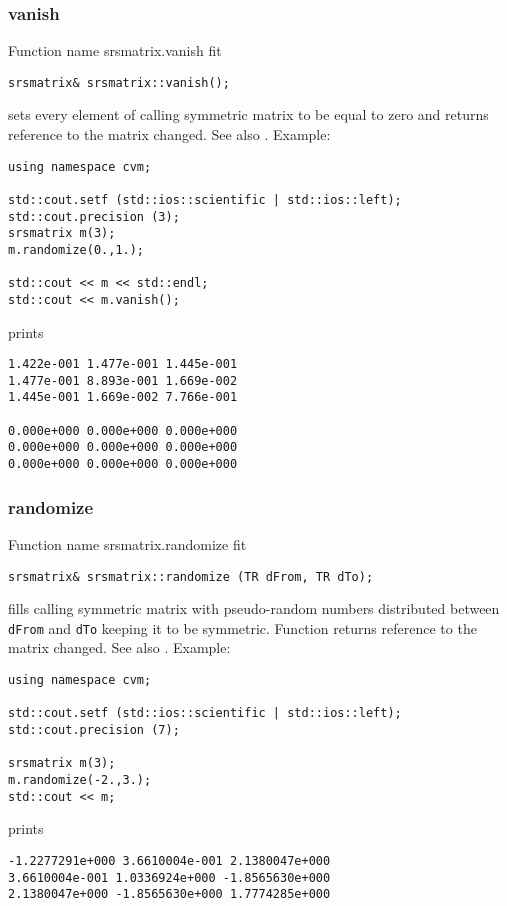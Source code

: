 \subsubsection{vanish}
Function%
\pdfdest name {srsmatrix.vanish} fit
\begin{verbatim}
srsmatrix& srsmatrix::vanish();
\end{verbatim}
sets every element of  calling symmetric 
matrix to be equal to zero
and returns  reference to
the matrix changed.
See also .
Example:
\begin{Verbatim}
using namespace cvm;

std::cout.setf (std::ios::scientific | std::ios::left); 
std::cout.precision (3);
srsmatrix m(3);
m.randomize(0.,1.);

std::cout << m << std::endl;
std::cout << m.vanish();
\end{Verbatim}
prints
\begin{Verbatim}
1.422e-001 1.477e-001 1.445e-001
1.477e-001 8.893e-001 1.669e-002
1.445e-001 1.669e-002 7.766e-001

0.000e+000 0.000e+000 0.000e+000
0.000e+000 0.000e+000 0.000e+000
0.000e+000 0.000e+000 0.000e+000
\end{Verbatim}
\newpage




\subsubsection{randomize}
Function%
\pdfdest name {srsmatrix.randomize} fit
\begin{verbatim}
srsmatrix& srsmatrix::randomize (TR dFrom, TR dTo);
\end{verbatim}
fills  calling symmetric matrix with pseudo-random 
numbers distributed between
\verb"dFrom" and \verb"dTo" keeping it to be symmetric.
Function
returns  reference to the matrix changed.
See also
.
Example:
\begin{Verbatim}
using namespace cvm;

std::cout.setf (std::ios::scientific | std::ios::left); 
std::cout.precision (7);

srsmatrix m(3);
m.randomize(-2.,3.);
std::cout << m;
\end{Verbatim}
prints
\begin{Verbatim}
-1.2277291e+000 3.6610004e-001 2.1380047e+000
3.6610004e-001 1.0336924e+000 -1.8565630e+000
2.1380047e+000 -1.8565630e+000 1.7774285e+000
\end{Verbatim}
\newpage

